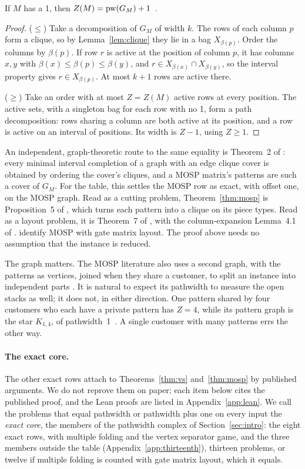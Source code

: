 \begin{theorem}\label{thm:mosp}
If $M$ has a 1, then $Z(M)=\mathrm{pw}(G_M)+1$~.
\end{theorem}
\begin{proof}
($\le$) Take a decomposition of $G_M$ of width $k$. The rows of each column $p$
form a clique, so by Lemma~\ref{lem:clique} they lie in a bag $X_{\beta(p)}$.
Order the columns by $\beta(p)$. If row $r$ is active at the position of column
$p$, it has columns $x,y$ with $\beta(x)\le\beta(p)\le\beta(y)$, and
$r\in X_{\beta(x)}\cap X_{\beta(y)}$, so the interval property gives
$r\in X_{\beta(p)}$. At most $k+1$ rows are active there.

($\ge$) Take an order with at most $Z=Z(M)$ active rows at every position. The
active sets, with a singleton bag for each row with no 1, form a path
decomposition: rows sharing a column are both active at its position, and a row
is active on an interval of positions. Its width is $Z-1$, using $Z\ge1$.
\end{proof}
An independent, graph-theoretic route to the same equality is Theorem~2 of
\citet{SuchanTodinca2007}: every minimal interval completion of a graph with an
edge clique cover is obtained by ordering the cover's cliques, and a MOSP
matrix's patterns are such a cover of $G_M$.
For the table, this settles the MOSP row as exact, with offset one, on the MOSP
graph. Read as a cutting problem, Theorem~\ref{thm:mosp} is Proposition~5 of
\citet{Yanasse1997a}, which turns each pattern into a clique on its piece types.
Read as a layout problem, it is Theorem~7 of \citet{FellowsLangston1989}, with
the column-expansion Lemma~4.1 of \citet{FellowsLangston1987}.
\citet[Prop.~2]{LY2002} identify MOSP with gate matrix layout. The proof above
needs no assumption that the instance is reduced.

The graph matters. The MOSP literature also uses a second graph, with the
patterns as vertices, joined when they share a customer, to split an instance
into independent parts \citep{YanasseSenne2010}. It is natural to expect its
pathwidth to measure the open stacks as well; it does not, in either
direction. One pattern shared by four customers who each have a private
pattern has $Z=4$, while its pattern graph is the star $K_{1,4}$, of
pathwidth~1~. A single customer with many patterns errs the
other way.

\paragraph{The exact core.} The other exact rows attach to
Theorems~\ref{thm:vs} and~\ref{thm:mosp} by published arguments. We do not
reprove them on paper; each item below cites the published proof, and the Lean
proofs are listed in Appendix~\ref{app:lean}. We call the problems that equal
pathwidth or pathwidth plus one on every input the \emph{exact core}, the
members of the pathwidth complex of Section~\ref{sec:intro}: the eight exact
rows, with multiple folding and the vertex separator game, and the three
members outside the table (Appendix~\ref{app:thirteenth}), thirteen problems,
or twelve if multiple folding is counted with gate matrix layout, which it
equals.

